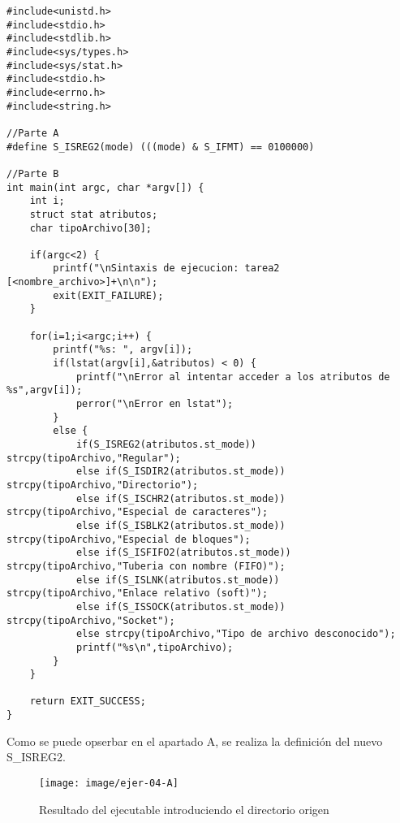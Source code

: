 \lstset{language=, breaklines=true, basicstyle=\footnotesize}
\begin{lstlisting}[frame=single]
#include<unistd.h>  
#include<stdio.h>
#include<stdlib.h>
#include<sys/types.h>  
#include<sys/stat.h>
#include<stdio.h>
#include<errno.h>
#include<string.h>

//Parte A
#define S_ISREG2(mode) (((mode) & S_IFMT) == 0100000)

//Parte B
int main(int argc, char *argv[]) {
	int i;
	struct stat atributos;
	char tipoArchivo[30];
	
	if(argc<2) {
		printf("\nSintaxis de ejecucion: tarea2 [<nombre_archivo>]+\n\n");
		exit(EXIT_FAILURE);
	}
	
	for(i=1;i<argc;i++) {
		printf("%s: ", argv[i]);
		if(lstat(argv[i],&atributos) < 0) {
			printf("\nError al intentar acceder a los atributos de %s",argv[i]);
			perror("\nError en lstat");
		}
		else {
			if(S_ISREG2(atributos.st_mode)) strcpy(tipoArchivo,"Regular");
			else if(S_ISDIR2(atributos.st_mode)) strcpy(tipoArchivo,"Directorio");
			else if(S_ISCHR2(atributos.st_mode)) strcpy(tipoArchivo,"Especial de caracteres");
			else if(S_ISBLK2(atributos.st_mode)) strcpy(tipoArchivo,"Especial de bloques");
			else if(S_ISFIFO2(atributos.st_mode)) strcpy(tipoArchivo,"Tuberia con nombre (FIFO)");
			else if(S_ISLNK(atributos.st_mode)) strcpy(tipoArchivo,"Enlace relativo (soft)");
			else if(S_ISSOCK(atributos.st_mode)) strcpy(tipoArchivo,"Socket");
			else strcpy(tipoArchivo,"Tipo de archivo desconocido");
			printf("%s\n",tipoArchivo);
		}
	}
	
	return EXIT_SUCCESS;
}

\end{lstlisting}

Como se puede opserbar en el apartado A, se realiza la definición del nuevo S\_ISREG2. \newline

\begin{figure}[H]
	\centering
	\texttt{[image: image/ejer-04-A]}
	\caption[Ejercicio 4.]{Resultado del ejecutable introduciendo el directorio origen}
	\label{fig:ejer-04-a}
\end{figure}










